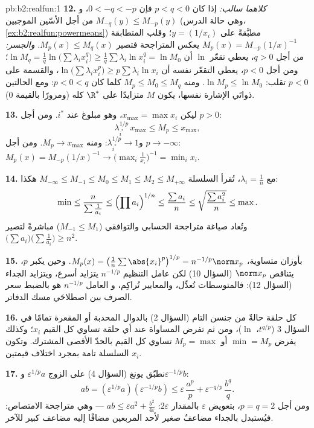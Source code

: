 \begin{solution}{pb:b2:realfun:1}
\textbf{12.} \emph{كلاهما سالب:} إذا كان $p < q < 0$ فإن $0 < -q <
-p$، و$M_{-q}(y) \leq M_{-p}(y)$ من أجل الأسّين الموجبين
(وهي حالة الدرس، \cref{ex:b2:realfun:powermeans}) مطبَّقةً على $y =
(1/x_i)$؛ وقلب المتطابقة $M_p(x) = M_{-p}(1/x)^{-1}$
يعكس المتراجحة فتصير $M_p(x) \leq M_q(x)$.
\emph{والجسر:} من أجل $q > 0$، يعطي تقعّر $\ln$ أن $\ln M_q =
\frac1q\ln\bigl(\sum\lambda_ix_i^q\bigr) \geq
\frac1q\sum\lambda_i\ln x_i^q = \ln M_0$؛ ومن أجل $p < 0$، يعطي التقعّر
نفسه أن $\ln\bigl(\sum\lambda_ix_i^p\bigr) \geq
p\sum\lambda_i\ln x_i$، والقسمة على $p < 0$ تقلب: $\ln M_p
\leq \ln M_0$. ومنه $M_p \leq M_0 \leq M_q$ كلما كان $p < 0 <
q$: ومع الحالتين ذواتَي الإشارة نفسها، يكون $M$ متزايدًا على $\R^*$ كله
(ومرورًا بالقيمة $0$).

\textbf{13.} ليكن $x_{\max} = \max x_i$، وهو مبلوغ عند $i^*$. ومن أجل
$p > 0$:
\[
\lambda_{i^*}^{1/p}\,x_{\max} \leq M_p \leq x_{\max},
\]
و$\lambda_{i^*}^{1/p} \to 1$: ومنه $M_p \to x_{\max}$. ومن أجل $p \to
-\infty$: $M_p(x) = M_{-p}(1/x)^{-1} \to
\bigl(\max_i\frac1{x_i}\bigr)^{-1} = \min_ix_i$.

\textbf{14.} مع $\lambda_i = \frac1n$، تُقرأ السلسلة $M_{-\infty}
\leq M_{-1} \leq M_0 \leq M_1 \leq M_2 \leq M_{+\infty}$ هكذا:
\[
\min \leq \frac{n}{\sum\frac1{a_i}} \leq \Bigl(\prod
a_i\Bigr)^{1/n} \leq \frac{\sum a_i}{n} \leq
\sqrt{\frac{\sum a_i^2}{n}} \leq \max .
\]
وتُعاد صياغة متراجحة الحسابي والتوافقي ($M_{-1} \leq M_1$) مباشرةً لتصير
$\bigl(\sum a_i\bigr)\bigl(\sum\frac1{a_i}\bigr) \geq n^2$.

\textbf{15.} بأوزان متساوية، $M_p(x) =
\bigl(\frac1n\sum\abs{x_i}^p\bigr)^{1/p} = n^{-1/p}\norm x_p$.
وحين يكبر $p$، يتناقص $\norm x_p$ (السؤال 10) لكن
عامل التنظيم $n^{-1/p}$ يتزايد أسرع، ويتزايد الجداء
(السؤال 12): فالمتوسطات تُعدِّل، والمعايير تُراكِم، و
العامل $n^{-1/p}$ هو بالضبط سعر الصرف بين
اصطلاحَي مسك الدفاتر.

\textbf{16.} كل حلقة حالةٌ من جنسن التام
(السؤال 2) بالدوال المحدبة أو المقعرة تمامًا في
السؤال 3 ($t^{q/p}$، $\ln$)، ومن ثم تفرض المساواة عند أي حلقة
تساوي كل القيم $x_i$؛ وكذلك يفرض $\min = M_p$ أو $M_p = \max$
تساوي كل القيم بالحدّ الأقصى المشترك. وتكون السلسلة
تامة بمجرد اختلاف قيمتين $x_i$.

\textbf{17.} نطبّق يونغ (السؤال 4) على الزوج
$\varepsilon^{1/p}a$ و$\varepsilon^{-1/p}b$:
\[
ab = (\varepsilon^{1/p}a)(\varepsilon^{-1/p}b)
\leq \varepsilon\,\frac{a^p}p +
\varepsilon^{-q/p}\,\frac{b^q}q .
\]
ومن أجل $p = q = 2$، بتعويض $\varepsilon$ بالمقدار $2\varepsilon$:
$ab \leq \varepsilon a^2 + \frac{b^2}{4\varepsilon}$ --- وهي
متراجحة الامتصاص: فيُستبدل بالجداء مضاعفٌ صغير
لأحد المربعين مضافًا إليه مضاعف كبير للآخر.


\end{solution}
